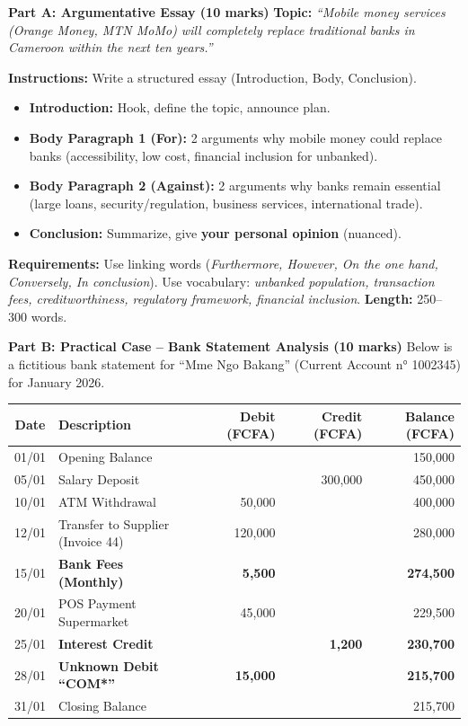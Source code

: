 \documentclass[11pt]{article}
\begin{document}
\begin{exercice}
\textbf{Part A: Argumentative Essay (10 marks)}
\textbf{Topic:} \emph{``Mobile money services (Orange Money, MTN MoMo) will completely replace traditional banks in Cameroon within the next ten years.''}

\textbf{Instructions:} Write a structured essay (Introduction, Body, Conclusion).
\begin{itemize}
    \item \textbf{Introduction:} Hook, define the topic, announce plan.
    \item \textbf{Body Paragraph 1 (For):} 2 arguments why mobile money could replace banks (accessibility, low cost, financial inclusion for unbanked).
    \item \textbf{Body Paragraph 2 (Against):} 2 arguments why banks remain essential (large loans, security/regulation, business services, international trade).
    \item \textbf{Conclusion:} Summarize, give \textbf{your personal opinion} (nuanced).
\end{itemize}
\textbf{Requirements:} Use linking words (\emph{Furthermore, However, On the one hand, Conversely, In conclusion}). Use vocabulary: \emph{unbanked population, transaction fees, creditworthiness, regulatory framework, financial inclusion}. \textbf{Length:} 250--300 words.

\textbf{Part B: Practical Case -- Bank Statement Analysis (10 marks)}
Below is a fictitious bank statement for ``Mme Ngo Bakang'' (Current Account n° 1002345) for January 2026.

\begin{center}
\begin{tabular}{|c|l|r|r|r|}
\hline
\textbf{Date} & \textbf{Description} & \textbf{Debit (FCFA)} & \textbf{Credit (FCFA)} & \textbf{Balance (FCFA)} \\ \hline
01/01 & Opening Balance & & & 150,000 \\ \hline
05/01 & Salary Deposit & & 300,000 & 450,000 \\ \hline
10/01 & ATM Withdrawal & 50,000 & & 400,000 \\ \hline
12/01 & Transfer to Supplier (Invoice 44) & 120,000 & & 280,000 \\ \hline
15/01 & \textbf{Bank Fees (Monthly)} & \textbf{5,500} & & \textbf{274,500} \\ \hline
20/01 & POS Payment Supermarket & 45,000 & & 229,500 \\ \hline
25/01 & \textbf{Interest Credit} & & \textbf{1,200} & \textbf{230,700} \\ \hline
28/01 & \textbf{Unknown Debit ``COM*''} & \textbf{15,000} & & \textbf{215,700} \\ \hline
31/01 & Closing Balance & & & 215,700 \\ \hline
\end{tabular}
\end{center}


\end{exercice}
\end{document}
